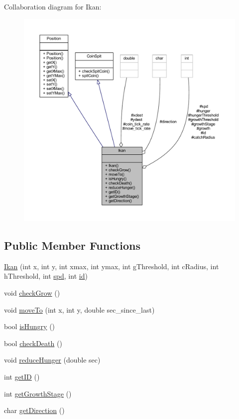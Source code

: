 Collaboration diagram for Ikan\+:
\nopagebreak
\begin{figure}[H]
\begin{center}
\leavevmode
\includegraphics[width=350pt]{class_ikan__coll__graph}
\end{center}
\end{figure}
\subsection*{Public Member Functions}
\begin{DoxyCompactItemize}
\item 
\mbox{\hyperlink{class_ikan_a0770a992c26f08ba3d9bad79fec71d55}{Ikan}} (int x, int y, int xmax, int ymax, int g\+Threshold, int c\+Radius, int h\+Threshold, int \mbox{\hyperlink{class_ikan_aac75c79c60a94f5607bdc2730203fd6f}{spd}}, int \mbox{\hyperlink{class_ikan_a9af33ebcd489980e17cbd4b876692e85}{id}})
\item 
void \mbox{\hyperlink{class_ikan_a68425d0df0528611318bdbef89aaf039}{check\+Grow}} ()
\item 
void \mbox{\hyperlink{class_ikan_af1b9d17721061771c7ea855b9c6e301d}{move\+To}} (int x, int y, double sec\+\_\+since\+\_\+last)
\item 
bool \mbox{\hyperlink{class_ikan_a893df179377af8174785228240eead8d}{is\+Hungry}} ()
\item 
bool \mbox{\hyperlink{class_ikan_a9a607ca1962b8f6029562e5571eaeb5c}{check\+Death}} ()
\item 
void \mbox{\hyperlink{class_ikan_aadb3eab63a3277d12d0cd4af5a9c96aa}{reduce\+Hunger}} (double sec)
\item 
int \mbox{\hyperlink{class_ikan_aa047dd2004a534353200f274e1541127}{get\+ID}} ()
\item 
int \mbox{\hyperlink{class_ikan_aa224e500b9f7c1f1e39b6045041a0d2f}{get\+Growth\+Stage}} ()
\item 
char \mbox{\hyperlink{class_ikan_af92d7548a85251152d24c6906c504298}{get\+Direction}} ()
\end{DoxyCompactItemize}
